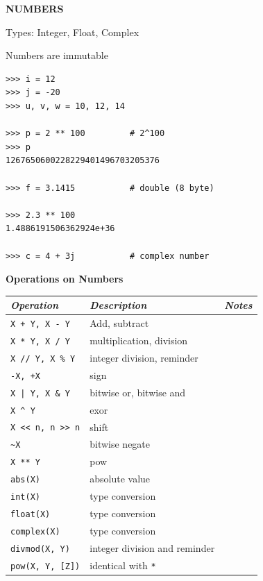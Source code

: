 \documentclass[9pt,a4wide]{extarticle}
\begin{document}


\bigskip
{\LARGE\bf NUMBERS}

Types: Integer, Float, Complex

Numbers are immutable

\begin{verbatim}
>>> i = 12
>>> j = -20
>>> u, v, w = 10, 12, 14

>>> p = 2 ** 100         # 2^100
>>> p
1267650600228229401496703205376

>>> f = 3.1415           # double (8 byte)

>>> 2.3 ** 100
1.4886191506362924e+36

>>> c = 4 + 3j           # complex number
\end{verbatim}



\medskip
{\bf Operations on Numbers}

\medskip

\begin{supertabular}{|l|p{12cm}|c|}\hline
{\em Operation}      & {\em Description}        &  {\em Notes} \\ \hline\hline

{\tt X + Y, X - Y}   & Add, subtract            &        \\ \hline
{\tt X * Y, X / Y}   & multiplication, division  &        \\ \hline
{\tt X // Y, X \% Y} & integer division, reminder  &        \\ \hline
{\tt -X, +X}         & sign                         &        \\ \hline
{\tt X | Y, X \& Y}   & bitwise or, bitwise and   &        \\ \hline
{\tt X \^{} Y}        &  exor                        &        \\ \hline
{\tt X << n, n >> n} &  shift                        &        \\ \hline
{\tt \~{}X}             & bitwise negate                      &        \\ \hline
{\tt X ** Y}         &  pow                        &        \\ \hline
{\tt abs(X)}         &  absolute value                        &        \\ \hline
{\tt int(X)}         &  type conversion                        &        \\ \hline
{\tt float(X)}         &  type conversion                        &        \\ \hline
{\tt complex(X)}         & type conversion        &        \\ \hline
{\tt divmod(X, Y)}       & integer division and reminder   &        \\ \hline
{\tt pow(X, Y, [Z])}     & identical with {\tt **}  &        \\ \hline
\end{supertabular}
\end{document}
